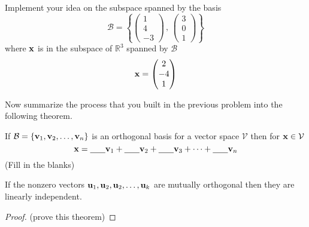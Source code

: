 \begin{problem}
    Implement your idea on the subspace spanned by the basis
    \[ \mathcal{B} = \left\{ \begin{pmatrix} 1\\4\\-3 \end{pmatrix}\, , \, \begin{pmatrix}
            3 \\ 0 \\ 1 \end{pmatrix} \right\} \]
    where ${\bf x}$ is in the subspace of $\mathbb{R}^3$ spanned by $\mathcal{B}$
    \[ {\bf x} = \begin{pmatrix} 2 \\ -4\\ 1 \end{pmatrix} \]
\end{problem}

Now summarize the process that you built in the previous problem into the following
theorem.
\begin{thm}\label{thm:orthogonal_basis}
    If $\mathcal{B} = \{{\bf v}_1, {\bf v}_2, \ldots, {\bf v}_n\}$ is an orthogonal basis for a vector
    space $\mathcal{V}$ then for ${\bf x} \in \mathcal{V}$
    \[ {\bf x} = \underline{\hspace{0.25in}} {\bf v}_1 + \underline{\hspace{0.25in}} {\bf v}_2 +
    \underline{\hspace{0.25in}} {\bf v}_3 + \cdots + \underline{\hspace{0.25in}} {\bf v}_n \]
    (Fill in the blanks)
\end{thm}


\begin{thm}
    If the nonzero vectors ${\bf u}_1, {\bf u}_2, {\bf u}_2, \dots, {\bf u}_k$ are mutually orthogonal
    then they are linearly independent.
\end{thm}
\begin{proof}
    (prove this theorem)
\end{proof}


